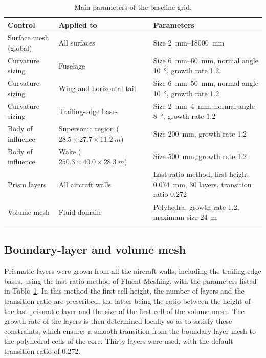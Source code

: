 \begin{table}[htbp]
  \centering
  \caption{Main parameters of the baseline grid.}
  \label{tab:val_meshparams}
  \small
  \begin{tabular}{>{\raggedright\arraybackslash}p{3.0cm}>{\raggedright\arraybackslash}p{4.0cm}>{\raggedright\arraybackslash}p{5.0cm}}
    \hline
    Control & Applied to & Parameters \\
    \hline
    Surface mesh (global) & All surfaces & Size \SIrange{2}{18000}{mm} \\[2pt]
    Curvature sizing & Fuselage & Size \SIrange{6}{60}{mm}, normal angle \SI{10}{\degree}, growth rate 1.2 \\[2pt]
    Curvature sizing & Wing and horizontal tail & Size \SIrange{6}{50}{mm}, normal angle \SI{10}{\degree}, growth rate 1.2 \\[2pt]
    Curvature sizing & Trailing-edge bases & Size \SIrange{2}{4}{mm}, normal angle \SI{8}{\degree}, growth rate 1.2 \\[2pt]
    Body of influence & Supersonic region ($28.5 \times 27.7 \times \SI{11.2}{m}$) & Size \SI{200}{mm}, growth rate 1.2 \\[2pt]
    Body of influence & Wake ($250.3 \times 40.0 \times \SI{28.3}{m}$) & Size \SI{500}{mm}, growth rate 1.2 \\[2pt]
    Prism layers & All aircraft walls & Last-ratio method, first height \SI{0.074}{mm}, 30 layers, transition ratio 0.272 \\[2pt]
    Volume mesh & Fluid domain & Polyhedra, growth rate 1.2, maximum size \SI{24}{m} \\
    \hline
    \multicolumn{3}{l}{Total number of cells: $27.6 \times 10^{6}$} \\
    \hline
  \end{tabular}
\end{table}

\subsection{Boundary-layer and volume mesh}
\label{sec:val_volmesh}
Prismatic layers were grown from all the aircraft walls, including the trailing-edge bases, using the last-ratio method of Fluent Meshing, with the parameters listed in Table~\ref{tab:val_meshparams}. In this method the first-cell height, the number of layers and the transition ratio are prescribed, the latter being the ratio between the height of the last prismatic layer and the size of the first cell of the volume mesh. The growth rate of the layers is then determined locally so as to satisfy these constraints, which ensures a smooth transition from the boundary-layer mesh to the polyhedral cells of the core. Thirty layers were used, with the default transition ratio of 0.272.

